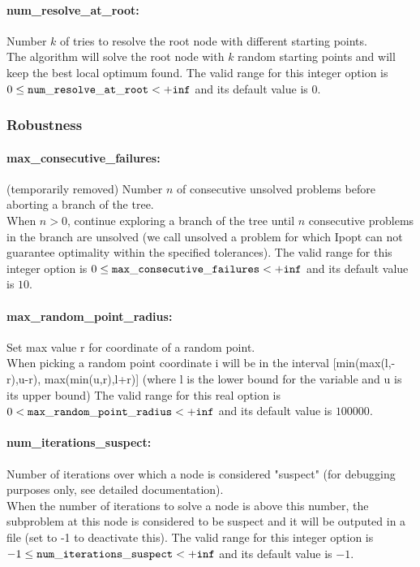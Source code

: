 \paragraph{num\_resolve\_at\_root:} Number $k$ of tries to resolve the root node with different starting points. $\;$ \\
 The algorithm will solve the root node with $k$
random starting points and will keep the best
local optimum found. The valid range for this integer option is
$0 \le {\tt num\_resolve\_at\_root } <  {\tt +inf}$
and its default value is $0$.


\subsubsection{Robustness}
\label{sec:bonmin_options_for_robustness}
\paragraph{max\_consecutive\_failures:} (temporarily removed) Number $n$ of consecutive unsolved problems before aborting a branch of the tree. $\;$ \\
 When $n > 0$, continue exploring a branch of the
tree until $n$ consecutive problems in the branch
are unsolved (we call unsolved a problem for
which Ipopt can not guarantee optimality within
the specified tolerances). The valid range for this integer option is
$0 \le {\tt max\_consecutive\_failures } <  {\tt +inf}$
and its default value is $10$.


\paragraph{max\_random\_point\_radius:} Set max value r for coordinate of a random point. $\;$ \\
 When picking a random point coordinate i will be
in the interval [min(max(l,-r),u-r),
max(min(u,r),l+r)] (where l is the lower bound
for the variable and u is its upper bound) The valid range for this real option is 
$0 <  {\tt max\_random\_point\_radius } <  {\tt +inf}$
and its default value is $100000$.


\paragraph{num\_iterations\_suspect:} Number of iterations over which a node is considered "suspect" (for debugging purposes only, see detailed documentation). $\;$ \\
 When the number of iterations to solve a node is
above this number, the subproblem at this node is
considered to be suspect and it will be outputed
in a file (set to -1 to deactivate this). The valid range for this integer option is
$-1 \le {\tt num\_iterations\_suspect } <  {\tt +inf}$
and its default value is $-1$.


